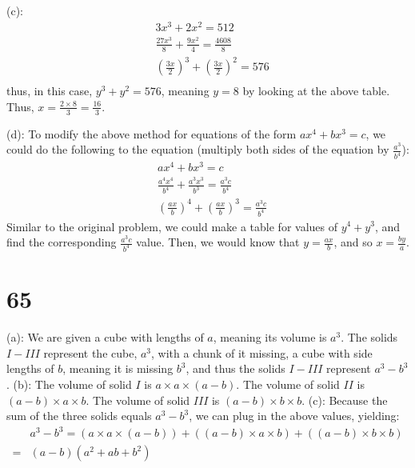 \documentclass{article}
\theoremstyle{definition}
\begin{document}
(c): 
\[
\begin{array}{rl}
	& 3x^3+2x^2=512 \\
	& \frac{27x^3}{8}+\frac{9x^2}{4}=\frac{4608}{8} \\
	& (\frac{3x}{2})^3+(\frac{3x}{2})^2=576 \\
\end{array}
\]
thus, in this case, $y^3+y^2=576$, meaning $y=8$ by looking at the above table. Thus, $x=\frac{2\times 8}{3}=\frac{16}{3}$.\newline



(d): To modify the above method for equations of the form $ax^4+bx^3=c$, we could do the following to the equation (multiply both sides of the equation by 
$\frac{a^3}{b^4}$):
\[
\begin{array}{rl}
	& ax^4+bx^3=c \\
	& \frac{a^4x^4}{b^4}+\frac{a^3x^3}{b^3}=\frac{a^3c}{b^4} \\
	& (\frac{ax}{b})^4+(\frac{ax}{b})^3=\frac{a^3c}{b^4}
\end{array}
\]
Similar to the original problem, we could make a table for values of $y^4+y^3$, and find the corresponding $\frac{a^3c}{b^4}$ value. Then, we would know that 
$y=\frac{ax}{b}$, and so $x=\frac{by}{a}$.

\section*{65}
(a): We are given a cube with lengths of $a$, meaning its volume is $a^3$. The solids $I-III$ represent the cube, $a^3$, with a chunk of it missing, a cube with side lengths 
of $b$, meaning it is missing $b^3$, and thus the solids $I-III$ represent $a^3-b^3$.\newline
(b): The volume of solid $I$ is $a\times a\times (a-b)$. The volume of solid $II$ is $(a-b)\times a\times b$. The volume of solid $III$ is $(a-b)\times b\times b$.\newline
(c): Because the sum of the three solids equals $a^3-b^3$, we can plug in the above values, yielding:
\[
\begin{array}{rl}
	& a^3-b^3=(a\times a\times (a-b))+((a-b)\times a\times b)+((a-b)\times b\times b) \\
=	& (a-b)(a^2+ab+b^2)
\end{array}
\]
\end{document}
